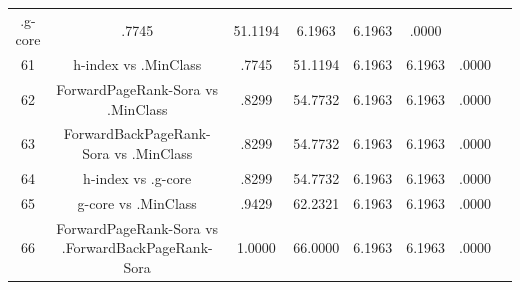 \documentclass[a4paper,10pt]{article}
\begin{document}
\begin{landscape}
\begin{table}[!htp]
\begin{tabular}{cccccccc}
.g-core&.7745&51.1194&6.1963&6.1963&.0000\\61&h-index vs .MinClass&.7745&51.1194&6.1963&6.1963&.0000\\62&ForwardPageRank-Sora vs .MinClass&.8299&54.7732&6.1963&6.1963&.0000\\63&ForwardBackPageRank-Sora vs .MinClass&.8299&54.7732&6.1963&6.1963&.0000\\64&h-index vs .g-core&.8299&54.7732&6.1963&6.1963&.0000\\65&g-core vs .MinClass&.9429&62.2321&6.1963&6.1963&.0000\\66&ForwardPageRank-Sora vs .ForwardBackPageRank-Sora&1.0000&66.0000&6.1963&6.1963&.0000\\\hline
\end{tabular}
\end{table}

\end{landscape}
\end{document}
